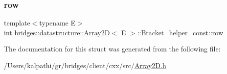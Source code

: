 \subsubsection{\texorpdfstring{row}{row}}
{\footnotesize\ttfamily template$<$typename E$>$ \\
int \mbox{\hyperlink{classbridges_1_1datastructure_1_1_array2_d}{bridges\+::datastructure\+::\+Array2D}}$<$ E $>$\+::Bracket\+\_\+helper\+\_\+const\+::row}



The documentation for this struct was generated from the following file\+:\begin{DoxyCompactItemize}
\item 
/\+Users/kalpathi/gr/bridges/client/cxx/src/\mbox{\hyperlink{_array2_d_8h}{Array2\+D.\+h}}\end{DoxyCompactItemize}
